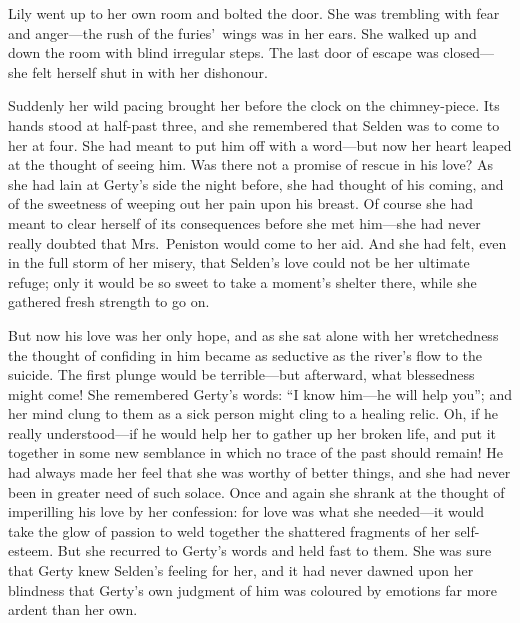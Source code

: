 \documentclass[12pt,a4paper]{book}
\begin{document}
Lily went up to her own room and bolted the door. She was
trembling with fear and anger---the rush of the furies'\ wings was
in her ears. She walked up and down the room with blind irregular
steps. The last door of escape was closed---she felt herself shut
in with her dishonour.





Suddenly her wild pacing brought her before the clock on the
chimney-piece. Its hands stood at half-past three, and she
remembered that Selden was to come to her at four. She had
meant to put him off with a word---but now her heart leaped at the
thought of seeing him. Was there not a promise of rescue in his
love? As she had lain at Gerty's side the night before, she had
thought of his coming, and of the sweetness of weeping out her
pain upon his breast. Of course she had meant to clear herself of
its consequences before she met him---she had never really doubted
that Mrs.\ Peniston would come to her aid. And she had felt, even
in the full storm of her misery, that Selden's love could not be
her ultimate refuge; only it would be so sweet to take a moment's
shelter there, while she gathered fresh strength to go on.





But now his love was her only hope, and as she sat alone with her
wretchedness the thought of confiding in him became as seductive
as the river's flow to the suicide. The first plunge would be
terrible---but afterward, what blessedness might come! She
remembered Gerty's words: ``I know him---he will help you''; and her
mind clung to them as a sick person might cling to a healing
relic. Oh, if he really understood---if he would help her to
gather up her broken life, and put it together in some new
semblance in which no trace of the past should remain! He had
always made her feel that she was worthy of better things, and
she had never been in greater need of such solace. Once and again
she shrank at the thought of imperilling his love by her
confession: for love was what she needed---it would take the glow
of passion to weld together the shattered fragments of her
self-esteem. But she recurred to Gerty's words and held fast to
them. She was sure that Gerty knew Selden's feeling for her, and
it had never dawned upon her blindness that Gerty's own judgment
of him was coloured by emotions far more ardent than her own.
\end{document}
